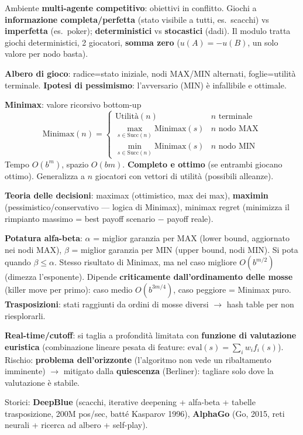 \documentclass[10pt,a4paper]{article}
\begin{document}
Ambiente \textbf{multi-agente competitivo}: obiettivi in conflitto. Giochi a \textbf{informazione completa/perfetta} (stato visibile a tutti, es.\ scacchi) vs \textbf{imperfetta} (es.\ poker); \textbf{deterministici} vs \textbf{stocastici} (dadi). Il modulo tratta giochi deterministici, 2 giocatori, \textbf{somma zero} ($u(A)=-u(B)$, un solo valore per nodo basta).

\textbf{Albero di gioco}: radice=stato iniziale, nodi MAX/MIN alternati, foglie=utilità terminale. \textbf{Ipotesi di pessimismo}: l'avversario (MIN) è infallibile e ottimale.

\textbf{Minimax}: valore ricorsivo bottom-up
\[
\text{Minimax}(n) =
\begin{cases}
\text{Utilità}(n) & n \text{ terminale}\\
\max_{s \in \text{Succ}(n)} \text{Minimax}(s) & n \text{ nodo MAX}\\
\min_{s \in \text{Succ}(n)} \text{Minimax}(s) & n \text{ nodo MIN}
\end{cases}
\]
Tempo $O(b^m)$, spazio $O(bm)$. \textbf{Completo e ottimo} (se entrambi giocano ottimo). Generalizza a $n$ giocatori con vettori di utilità (possibili alleanze).

\textbf{Teoria delle decisioni}: maximax (ottimistico, max dei max), \textbf{maximin} (pessimistico/conservativo --- logica di Minimax), minimax regret (minimizza il rimpianto massimo = best payoff scenario $-$ payoff reale).

\textbf{Potatura alfa-beta}: $\alpha$ = miglior garanzia per MAX (lower bound, aggiornato nei nodi MAX), $\beta$ = miglior garanzia per MIN (upper bound, nodi MIN). Si pota quando $\beta \le \alpha$. Stesso risultato di Minimax, ma nel caso migliore $O(b^{m/2})$ (dimezza l'esponente). Dipende \textbf{criticamente dall'ordinamento delle mosse} (killer move per primo): caso medio $O(b^{3m/4})$, caso peggiore = Minimax puro. \textbf{Trasposizioni}: stati raggiunti da ordini di mosse diversi $\to$ hash table per non riesplorarli.

\textbf{Real-time/cutoff}: si taglia a profondità limitata con \textbf{funzione di valutazione euristica} (combinazione lineare pesata di feature: $\text{eval}(s)=\sum_i w_i f_i(s)$). Rischio: \textbf{problema dell'orizzonte} (l'algoritmo non vede un ribaltamento imminente) $\to$ mitigato dalla \textbf{quiescenza} (Berliner): tagliare solo dove la valutazione è stabile.

Storici: \textbf{DeepBlue} (scacchi, iterative deepening + alfa-beta + tabelle trasposizione, 200M pos/sec, batté Kasparov 1996), \textbf{AlphaGo} (Go, 2015, reti neurali + ricerca ad albero + self-play).
\end{document}
